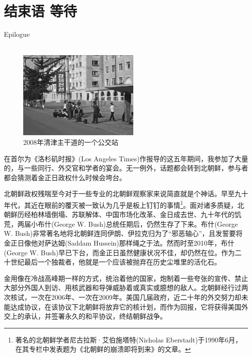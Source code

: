\chapter*{结束语 等待}
\vspace{20mm}
\begin{flushright}
	\textcolor{PinYinColor}{\EN \huge{Epilogue\\
			\ \\}}
\end{flushright}

\begin{figure}[!htbp]
	\centering
	\includegraphics[width=6cm]{./Chapters/Images/21.jpg}
	\caption*{2008年清津主干道的一个公交站}
\end{figure}

在首尔为《洛杉矶时报》(Los Angeles Times)作报导的这五年期间，我参加了大量的，与一些同行、外交官和学者的宴会。无一例外，话题都会转到北朝鲜，参与者都会猜测着金正日政权什么时候会垮台。

北朝鲜政权残喘至今对于一些专业的北朝鲜观察家来说简直就是个神话。早至九十年代，其近在眼前的覆灭被一致认为几乎是板上钉钉的事情\footnote{著名的北朝鲜学者尼古拉斯·艾伯施塔特(Nicholas Eberstadt)于1990年6月，在其专栏中发表题为《北朝鲜的崩溃即将到来》的文章。}。面对诸多质疑，北朝鲜历经柏林墙倒塌、苏联解体、中国市场化改革、金日成去世、九十年代的饥荒，两届小布什(George W. Bush)总统任期后，仍然生存了下来。布什(George W. Bush)非常著名地将北朝鲜连同伊朗、伊拉克归为了“邪恶轴心”，且发誓要将金正日像他对萨达姆(Saddam Hussein)那样绳之于法。然而时至2010年，布什(George W. Bush)早已下台，而金正日虽然健康状况不佳，却仍然在位。作为二十世纪最后一个独裁者，他就是一个应该被抛弃在历史尘堆里的活化石。

金用像在冷战高峰期一样的方式，统治着他的国家，炮制着一些夸张的宣传、禁止大部分外国人到访、用核武器和导弹威胁着或真实或臆想的敌人。北朝鲜经行过两次核试，一次在2006年、一次在2009年。美国几届政府，近二十年的外交努力却未能达成协议，在该协议下北朝鲜将放弃它的核计划，而作为回报，它将获得美国外交上的承认，并签署永久的和平协议，终结朝鲜战争。

